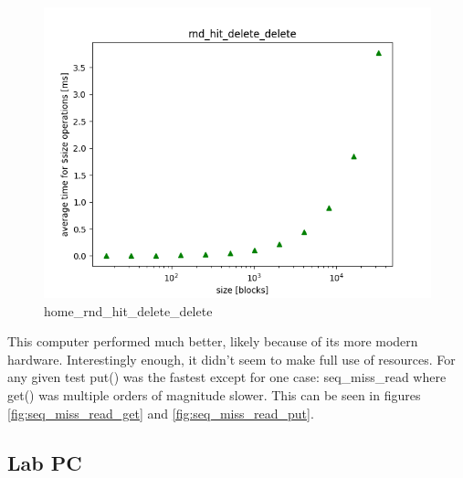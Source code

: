 \documentclass[twocolumn,11pt]{article}
\begin{document}
\begin{figure}[H]
  \includegraphics[width=\linewidth]{Pictures/HOMEPC/rnd_hit_delete_complete_delete.png}
  \caption{home\_rnd\_hit\_delete\_delete}
  \label{fig:home_rnd_hit_delete_delete}
\end{figure}

This computer performed much better, likely because of its more modern hardware.
Interestingly enough, it didn't seem to make full use of resources. For any
given test put() was the fastest except for one case: seq\_miss\_read where get()
was multiple orders of magnitude slower. This can be seen in figures
\ref{fig:seq_miss_read_get} and \ref{fig:seq_miss_read_put}.

\subsection{Lab PC}
\end{document}
